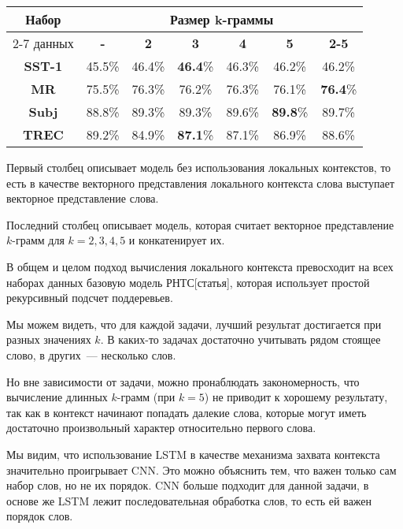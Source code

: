 \noindent \begin{minipage}{\linewidth}
 \label{tab:title} 
\begin{tabular}{|c|c|c|c|c|c|c|}
\hline
\multirow{2}{*}{Набор}   &         \multicolumn{6}{c|}{Размер k-граммы} \\ \cline{2-7} 
     данных              & \textbf{-} & \textbf{2} & \textbf{3} & \textbf{4} & \textbf{5} & \textbf{2-5} \\ \hline
\textbf{SST-1}           &  45.5\%    & 46.4\%     &\textbf{46.4}\%& 46.3\%     &  46.2\%    & 46.2\%           \\  \hline
\textbf{MR}              &  75.5\%    & 76.3\%     & 76.2\%     & 76.3\%     & 76.1\%     & \textbf{76.4}\% \\ \hline
\textbf{Subj}            &  88.8\%    & 89.3\%     & 89.3\%     & 89.6\%     &\textbf{89.8}\%    & 89.7\% \\ \hline
\textbf{TREC}            &  89.2\%    & 84.9\%     & \textbf{87.1}\%     & 87.1\%     &  86.9\%    & 88.6\%  \\ \hline
\end{tabular}
\vspace{5mm}
\end{minipage}
\vspace{5mm}

Первый столбец описывает модель без использования локальных контекстов, то есть в качестве векторного представления локального контекста слова выступает векторное представление слова.

Последний столбец описывает модель, которая считает векторное представление $k$-грамм для $k=2,3,4,5$ и конкатенирует их.

В общем и целом подход вычисления локального контекста превосходит на всех наборах данных базовую модель РНТС[статья], которая использует простой рекурсивный подсчет поддеревьев.

Мы можем видеть, что для каждой задачи, лучший результат достигается при разных значениях $k$. В каких-то задачах достаточно учитывать рядом стоящее слово, в других~--- несколько слов.

Но вне зависимости от задачи, можно пронаблюдать закономерность, что 
вычисление длинных $k$-грамм (при $k=5$) не приводит к хорошему результату, 
так как в контекст начинают попадать далекие слова, 
которые могут иметь достаточно произвольный характер относительно первого слова.

Мы видим, что использование LSTM в качестве механизма захвата контекста значительно проигрывает CNN.
Это можно объяснить тем, что важен только сам набор слов, но не их порядок. 
CNN больше подходит для данной задачи, в основе же LSTM лежит последовательная обработка слов, то есть ей важен порядок слов.

